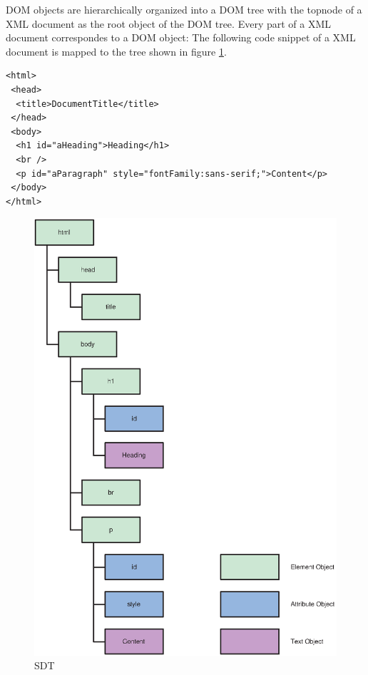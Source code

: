 
DOM objects are hierarchically organized into a DOM tree with the topnode of a XML document as the root object of the DOM tree. Every part of a XML document correspondes to a DOM object: The following code snippet of a XML document is mapped to the tree shown in figure \ref{fig:simpleDomTree}.

\begin{verbatim}
<html>
 <head>
  <title>DocumentTitle</title>
 </head>
 <body>
  <h1 id="aHeading">Heading</h1>
  <br />
  <p id="aParagraph" style="fontFamily:sans-serif;">Content</p>
 </body>
</html>
\end{verbatim}

\begin{figure}[htbp]
	\centering
		\includegraphics[scale=0.5]{simpleDomTree}
	\caption{SDT}
	\label{fig:simpleDomTree}
\end{figure}

